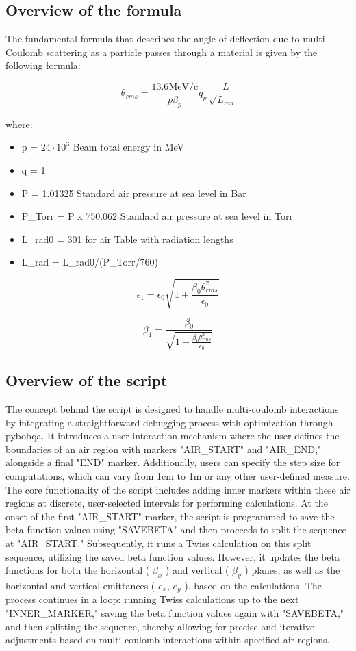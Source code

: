 \documentclass[a4paper,
               ]{jacow}
\begin{document}
\subsection{Overview of the formula}

The fundamental formula that describes the angle of deflection due to multi-Coulomb scattering as a particle passes through a material is given by the following formula:

\[
\theta_{rms} = \frac{13.6 \text{MeV/c}}{p\beta_{p}}q_{p}\sqrt\frac{L}{L_{rad}}\]

where:
\begin{itemize}
\item p = $24\cdot 10^{3}$ Beam total energy in MeV
\item q = 1
\item P = 1.01325  Standard air pressure at sea level in Bar
\item P\_Torr = P x 750.062 Standard air pressure at sea level in Torr
\item L\_rad0 = 301 for air \href{https://cds.cern.ch/record/941314/files/p245.pdf}{Table with radiation lengths}
\item L\_rad = L\_rad0/(P\_Torr/760)
\end{itemize}

\[
\epsilon_{1} = \epsilon_{0}\sqrt{1+\frac{\beta_{0}\theta_{rms}^{2}}{\epsilon_{0}}}
\]

\[
\beta_{1}=\frac{\beta_{0}}{\sqrt{1+\frac{\beta_{0}\theta_{rms}^{2}}{\epsilon_{0}}}}
\]


\subsection{Overview of the script}

The concept behind the script is designed to handle multi-coulomb interactions by integrating a straightforward debugging process with optimization through pybobqa. It introduces a user interaction mechanism where the user defines the boundaries of an air region with markers "AIR\_START" and "AIR\_END," alongside a final "END" marker. Additionally, users can specify the step size for computations, which can vary from 1cm to 1m or any other user-defined measure. The core functionality of the script includes adding inner markers within these air regions at discrete, user-selected intervals for performing calculations. At the onset of the first "AIR\_START" marker, the script is programmed to save the beta function values using "SAVEBETA" and then proceeds to split the sequence at "AIR\_START." Subsequently, it runs a Twiss calculation on this split sequence, utilizing the saved beta function values. However, it updates the beta functions for both the horizontal ( $\beta_{x}$ ) and vertical ( $\beta_{y}$ ) planes, as well as the horizontal and vertical emittances ( $e_{x}$, $e_{y}$ ), based on the calculations. The process continues in a loop: running Twiss calculations up to the next "INNER\_MARKER," saving the beta function values again with "SAVEBETA," and then splitting the sequence, thereby allowing for precise and iterative adjustments based on multi-coulomb interactions within specified air regions.
\end{document}
